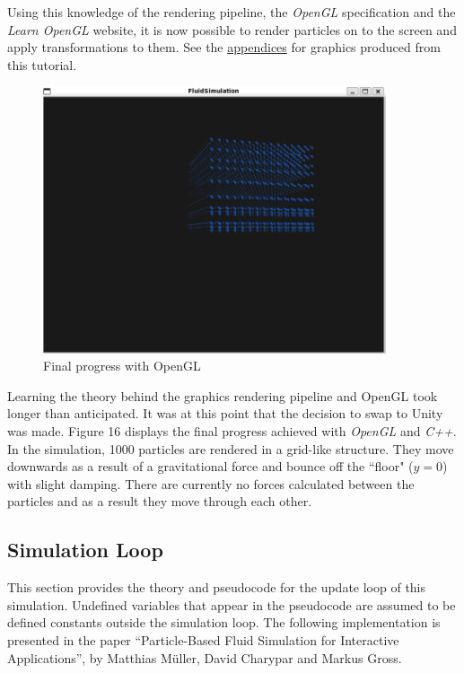 \documentclass[12pt]{article}
\begin{document}
    Using this knowledge of the rendering pipeline, the \textit{OpenGL} specification and the \textit{Learn OpenGL} website, it is now possible to render particles on to the screen and apply transformations to them. See the \hyperref[sec:appendices]{appendices} for graphics produced from this tutorial. 
    
    \begin{figure}[H]
        \begin{center}
            \includegraphics[width=0.9\textwidth]{openGLProg.png}
            \caption{Final progress with OpenGL}
        \end{center}
    \end{figure}
    
    Learning the theory behind the graphics rendering pipeline and OpenGL took longer than anticipated. It was at this point that the decision to swap to Unity was made. Figure 16 displays the final progress achieved with \textit{OpenGL} and \textit{C++}. In the simulation, 1000 particles are rendered in a grid-like structure. They move downwards as a result of a gravitational force and bounce off the ``floor" ($y = 0$) with slight damping. There are currently no forces calculated between the particles and as a result they move through each other.

    \subsection{Simulation Loop}

    This section provides the theory and pseudocode for the update loop of this simulation. Undefined variables that appear in the pseudocode are assumed to be defined constants outside the simulation loop. The following implementation is presented in the paper ``Particle-Based Fluid Simulation for Interactive Applications'', by Matthias Müller, David Charypar and Markus Gross\cite{sca}.
\end{document}
